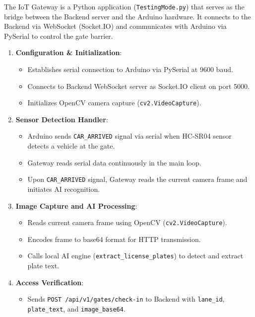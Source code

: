 \documentclass[a4paper]{article}
\begin{document}
The IoT Gateway is a Python application (\texttt{TestingMode.py}) that serves as the bridge between the Backend server and the Arduino hardware. It connects to the Backend via WebSocket (Socket.IO) and communicates with Arduino via PySerial to control the gate barrier.

\begin{tcolorbox}[colback=white!95!gray, colframe=black, title=IoT Gateway Architecture]
\begin{enumerate}
    \item \textbf{Configuration \& Initialization}:
    \begin{itemize}
        \item Establishes serial connection to Arduino via PySerial at 9600 baud.
        \item Connects to Backend WebSocket server as Socket.IO client on port 5000.
        \item Initializes OpenCV camera capture (\texttt{cv2.VideoCapture}).
    \end{itemize}
    \item \textbf{Sensor Detection Handler}:
    \begin{itemize}
        \item Arduino sends \texttt{CAR\_ARRIVED} signal via serial when HC-SR04 sensor detects a vehicle at the gate.
        \item Gateway reads serial data continuously in the main loop.
        \item Upon \texttt{CAR\_ARRIVED} signal, Gateway reads the current camera frame and initiates AI recognition.
    \end{itemize}
    \item \textbf{Image Capture and AI Processing}:
    \begin{itemize}
        \item Reads current camera frame using OpenCV (\texttt{cv2.VideoCapture}).
        \item Encodes frame to base64 format for HTTP transmission.
        \item Calls local AI engine (\texttt{extract\_license\_plates}) to detect and extract plate text.
    \end{itemize}
    \item \textbf{Access Verification}:
    \begin{itemize}
        \item Sends \texttt{POST /api/v1/gates/check-in} to Backend with \texttt{lane\_id}, \texttt{plate\_text}, and \texttt{image\_base64}.

\end{itemize}
\end{enumerate}
\end{tcolorbox}
\end{document}
